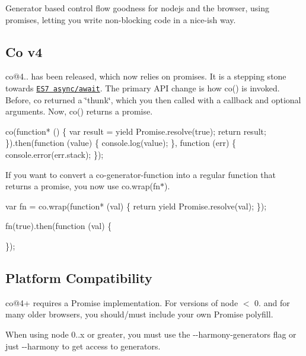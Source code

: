 \href{https://gitter.im/tj/co?utm_source=badge&utm_medium=badge&utm_campaign=pr-badge&utm_content=badge}{\tt } \href{https://npmjs.org/package/co}{\tt } \href{https://travis-ci.org/tj/co}{\tt } \href{https://coveralls.io/r/tj/co}{\tt } \href{https://npmjs.org/package/co}{\tt }

Generator based control flow goodness for nodejs and the browser, using promises, letting you write non-\/blocking code in a nice-\/ish way.

\subsection*{Co v4}

{\ttfamily co@4..} has been released, which now relies on promises. It is a stepping stone towards \href{https://github.com/lukehoban/ecmascript-asyncawait}{\tt E\+S7 async/await}. The primary A\+PI change is how {\ttfamily co()} is invoked. Before, {\ttfamily co} returned a \char`\"{}thunk\char`\"{}, which you then called with a callback and optional arguments. Now, {\ttfamily co()} returns a promise.


\begin{DoxyCode}
co(function* () \{
  var result = yield Promise.resolve(true);
  return result;
\}).then(function (value) \{
  console.log(value);
\}, function (err) \{
  console.error(err.stack);
\});
\end{DoxyCode}


If you want to convert a {\ttfamily co}-\/generator-\/function into a regular function that returns a promise, you now use {\ttfamily co.\+wrap(fn$\ast$)}.


\begin{DoxyCode}
var fn = co.wrap(function* (val) \{
  return yield Promise.resolve(val);
\});

fn(true).then(function (val) \{

\});
\end{DoxyCode}


\subsection*{Platform Compatibility}

{\ttfamily co@4+} requires a {\ttfamily Promise} implementation. For versions of node {\ttfamily $<$ 0.} and for many older browsers, you should/must include your own {\ttfamily Promise} polyfill.

When using node 0..\+x or greater, you must use the {\ttfamily -\/-\/harmony-\/generators} flag or just {\ttfamily -\/-\/harmony} to get access to generators.

